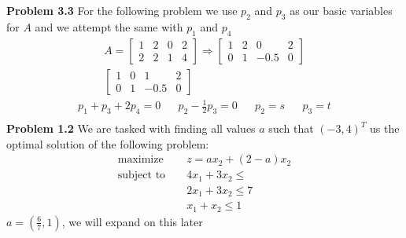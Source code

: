 \documentclass{article}
\begin{document}
\textbf{Problem 3.3} For the following problem we use $p_2$ and $p_3$ as our basic variables for $A$ and we attempt the same with $p_1$ and $p_4$
\begin{align*} A = 
    \begin{bmatrix}
      1 & 2 & 0 & 2 \\
      2 & 2 & 1 & 4
    \end{bmatrix} \Rightarrow
    \begin{bmatrix}
      1 & 2 & 0 & 2 \\
      0 & 1 & -0.5 & 0
    \end{bmatrix} \\
    \begin{bmatrix}
    1 & 0 & 1 & 2 \\
    0 & 1 & -0.5 & 0
    \end{bmatrix}
\end{align*}
\begin{align*}
p_1 + p_3 + 2p_4 = 0 && p_2 - \frac{1}{2}p_3 = 0 && p_2 = s && p_3 = t \\
\end{align*}
\textbf{Problem 1.2} We are tasked with finding all values $a$ such that $(-3,4)^T$ us the optimal solution of the following problem:
\begin{align*}
  \text{maximize } && z = ax_2 + (2-a)x_2 \\
  \text{subject to } && 4x_1 + 3x_2 \leq  \\
  && 2x_1 + 3x_2 \leq 7 \\ 
  && x_1 + x_2 \leq 1
\end{align*}
$a = (\frac{6}{7}, 1)$, we will expand on this later
\end{document}
